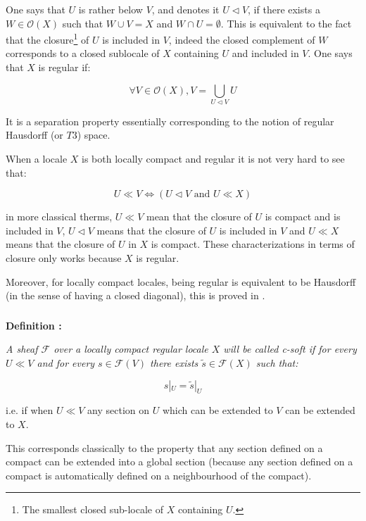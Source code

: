 \documentclass[a4paper]{article}
\newcommand{\Ocal}{\mathcal{O}}
\newcommand{\Fcal}{\mathcal{F}}
\newcommand{\block}[1]
{

\par \subsubsection{} #1

\bigskip}
\newcommand{\Def}[1]
	{
	
	\bigskip
	
	\textbf{Definition : }{\itshape #1}
	
	\bigskip
	
	}
\begin{document}
\block{One says that $U$ is rather below $V$, and denotes it $U \triangleleft V$, if there exists a $W \in \Ocal(X)$ such that $W \cup V= X$ and $W \cap U = \emptyset$. This is equivalent to the fact that the closure\footnote{The smallest closed sub-locale of $X$ containing $U$.} of $U$ is included in $V$, indeed the closed complement of $W$ corresponds to a closed sublocale of $X$ containing $U$ and included in $V$. One says that $X$ is regular if:

\[ \forall V \in \Ocal(X), V = \bigcup_{U \triangleleft V} U \]

It is a separation property essentially corresponding to the notion of regular Hausdorff (or $T3$) space.

When a locale $X$ is both locally compact and regular it is not very hard to see that:

\[ U \ll V \Leftrightarrow \left( U \triangleleft V \text{ and } U \ll X \right) \]

in more classical therms, $U \ll V$ mean that the closure of $U$ is compact and is included in $V$, $U \triangleleft V$ means that the closure of $U$ is included in $V$ and $U \ll X$ means that the closure of $U$ in $X$ is compact. These characterizations in terms of closure only works because $X$ is regular.


Moreover, for locally compact locales, being regular is equivalent to be Hausdorff (in the sense of having a closed diagonal), this is proved in \cite[II.4.8]{moerdijk2000proper}.

}

\block{\Def{A sheaf $\Fcal$ over a locally compact regular locale $X$ will be called \emph{c-soft} if for every $U \ll V$ and for every $s \in \Fcal(V)$ there exists $\widetilde{s} \in \Fcal(X)$ such that:

\[ s|_U = \widetilde{s}|_U \]

}

i.e. if when $U \ll V$ any section on $U$ which can be extended to $V$ can be extended to $X$.

This corresponds classically to the property that any section defined on a compact can be extended into a global section (because any section defined on a compact is automatically defined on a neighbourhood of the compact).
}
\end{document}
